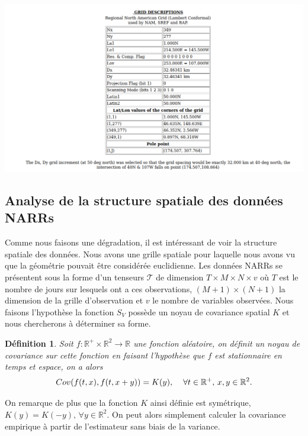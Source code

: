\documentclass[a4paper,10pt]{article}
\newtheorem{definition}{Définition}
\begin{document}
\begin{center}
	\label{maillage NARR}
	\includegraphics[scale=0.4]{grid_prop.png}
\end{center} 

\subsection{Analyse de la structure spatiale des données NARRs}
Comme nous faisons une dégradation, il est intéressant de voir la structure spatiale des données. Nous avons une grille spatiale pour laquelle nous avons vu que la géométrie pouvait être considérée euclidienne. Les données NARRs se présentent sous la forme d'un tenseurs $\mathcal{T}$ de dimension $T \times M\times N\times v$ où $T$ est le nombre de jours sur lesquels ont a ces observations, $(M+1)\times (N+1)$ la dimension de la grille d'observation et $v$ le nombre de variables observées. Nous faisons l'hypothèse la fonction $S_{V}$ possède un noyau de covariance spatial $K$ et nous chercherons à déterminer sa forme. 

\begin{definition}
	Soit $f:\mathbb{R}^{+}\times\mathbb{R}^2\to \mathbb{R}$ une fonction aléatoire, on définit un noyau de covariance sur cette fonction en faisant l'hypothèse que $f$ est stationnaire en temps et espace, on a alors
	\[Cov(f(t,x),f(t,x+y))=K(y), \hspace{4mm} \forall t \in \mathbb{R}^{+},\,x,y \in \mathbb{R}^2. \] 
\end{definition}
On remarque de plus que la fonction $K$ ainsi définie est symétrique, $K(y)=K(-y),\, \forall y \in \mathbb{R}^2$. On peut alors simplement calculer la covariance empirique à partir de l'estimateur sans biais de la variance.
\end{document}
